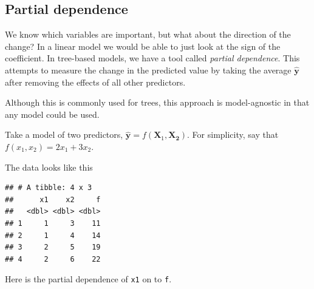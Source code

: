 \documentclass[openany]{book}
\newenvironment{Shaded}{\begin{snugshade}}{\end{snugshade}}
\newcommand{\DataTypeTok}[1]{\textcolor[rgb]{0.13,0.29,0.53}{#1}}
\newcommand{\DecValTok}[1]{\textcolor[rgb]{0.00,0.00,0.81}{#1}}
\newcommand{\KeywordTok}[1]{\textcolor[rgb]{0.13,0.29,0.53}{\textbf{#1}}}
\newcommand{\NormalTok}[1]{#1}
\newcommand{\OperatorTok}[1]{\textcolor[rgb]{0.81,0.36,0.00}{\textbf{#1}}}
\newcommand{\StringTok}[1]{\textcolor[rgb]{0.31,0.60,0.02}{#1}}
\begin{document}
\hypertarget{partial-dependence}{%
\subsection{Partial dependence}\label{partial-dependence}}

We know which variables are important, but what about the direction of the change? In a linear model we would be able to just look at the sign of the coefficient. In tree-based models, we have a tool called \emph{partial dependence}. This attempts to measure the change in the predicted value by taking the average \(\hat{\mathbf{y}}\) after removing the effects of all other predictors.

Although this is commonly used for trees, this approach is model-agnostic in that any model could be used.

Take a model of two predictors, \(\hat{\mathbf{y}} = f(\mathbf{X}_1, \mathbf{X_2})\). For simplicity, say that \(f(x_1, x_2) = 2x_1 + 3x_2\).

The data looks like this

\begin{Shaded}
\end{Shaded}

\begin{verbatim}
## # A tibble: 4 x 3
##      x1    x2     f
##   <dbl> <dbl> <dbl>
## 1     1     3    11
## 2     1     4    14
## 3     2     5    19
## 4     2     6    22
\end{verbatim}

Here is the partial dependence of \texttt{x1} on to \texttt{f}.

\begin{Shaded}
\end{Shaded}
\end{document}
